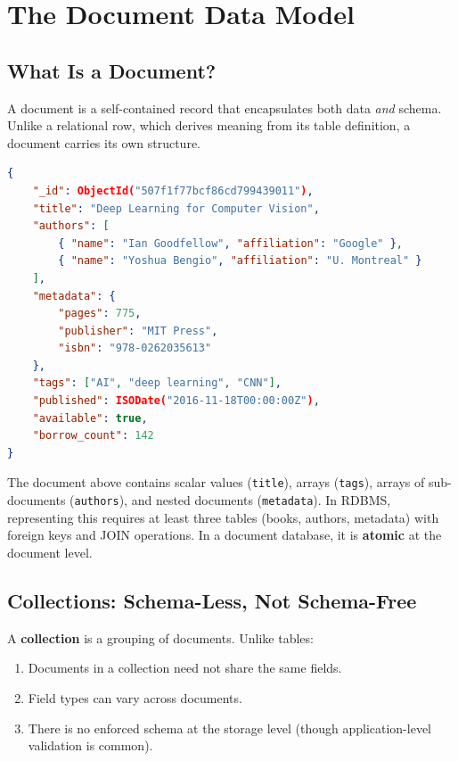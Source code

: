 \documentclass[12pt,a4paper]{article}
\begin{document}
\section{The Document Data Model}

\subsection{What Is a Document?}

A document is a self-contained record that encapsulates both data \textit{and} schema. Unlike a relational row, which derives meaning from its table definition, a document carries its own structure.

\begin{lstlisting}[language=json, caption={A MongoDB-style Document}]
{
    "_id": ObjectId("507f1f77bcf86cd799439011"),
    "title": "Deep Learning for Computer Vision",
    "authors": [
        { "name": "Ian Goodfellow", "affiliation": "Google" },
        { "name": "Yoshua Bengio", "affiliation": "U. Montreal" }
    ],
    "metadata": {
        "pages": 775,
        "publisher": "MIT Press",
        "isbn": "978-0262035613"
    },
    "tags": ["AI", "deep learning", "CNN"],
    "published": ISODate("2016-11-18T00:00:00Z"),
    "available": true,
    "borrow_count": 142
}
\end{lstlisting}

\begin{keyinsight}
The document above contains scalar values (\texttt{title}), arrays (\texttt{tags}), arrays of sub-documents (\texttt{authors}), and nested documents (\texttt{metadata}). In RDBMS, representing this requires at least three tables (books, authors, metadata) with foreign keys and JOIN operations. In a document database, it is \textbf{atomic} at the document level.
\end{keyinsight}

\subsection{Collections: Schema-Less, Not Schema-Free}

A \textbf{collection} is a grouping of documents. Unlike tables:

\begin{enumerate}[noitemsep]
    \item Documents in a collection need not share the same fields.
    \item Field types can vary across documents.
    \item There is no enforced schema at the storage level (though application-level validation is common).
\end{enumerate}
\end{document}
